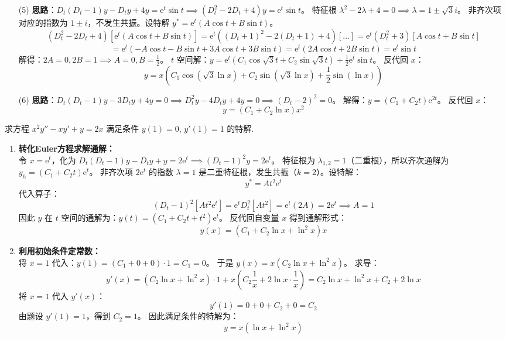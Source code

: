 \documentclass[lang=cn,11pt]{elegantbook}
\begin{document}
\begin{solution}
\begin{enumerate}
    \item[(5)] \textbf{思路}：$D_t(D_t-1)y - D_t y + 4y = \mathrm{e}^t\sin t \implies (D_t^2 - 2D_t + 4)y = \mathrm{e}^t\sin t$。
    特征根 $\lambda^2-2\lambda+4=0 \implies \lambda = 1 \pm \sqrt{3}i$。
    非齐次项对应的指数为 $1 \pm i$，不发生共振。设特解 $y^* = \mathrm{e}^t(A\cos t + B\sin t)$。
    \[
    (D_t^2-2D_t+4)[\mathrm{e}^t(A\cos t+B\sin t)] = \mathrm{e}^t((D_t+1)^2-2(D_t+1)+4)[\dots] = \mathrm{e}^t(D_t^2+3)[A\cos t+B\sin t]
    \]
    \[
    = \mathrm{e}^t(-A\cos t - B\sin t + 3A\cos t + 3B\sin t) = \mathrm{e}^t(2A\cos t + 2B\sin t) = \mathrm{e}^t\sin t
    \]
    解得：$2A=0, 2B=1 \implies A=0, B=\frac{1}{2}$。
    $t$ 空间解：$y = \mathrm{e}^t(C_1\cos\sqrt{3}t + C_2\sin\sqrt{3}t) + \frac{1}{2}\mathrm{e}^t\sin t$。
    反代回 $x$：
    \[
    y = x\left(C_1\cos(\sqrt{3}\ln x) + C_2\sin(\sqrt{3}\ln x) + \frac{1}{2}\sin(\ln x)\right)
    \]
    
    \item[(6)] \textbf{思路}：$D_t(D_t-1)y - 3D_t y + 4y = 0 \implies D_t^2 y - 4D_t y + 4y = 0 \implies (D_t-2)^2 = 0$。
    解得：$y = (C_1 + C_2 t)\mathrm{e}^{2t}$。
    反代回 $x$：
    \[
    y = (C_1 + C_2\ln x)x^2
    \]
\end{enumerate}
\end{solution}



\begin{exercise}[Euler方程初值问题]
求方程 $x^2y''-xy'+y=2x$ 满足条件 $y(1)=0$, $y'(1)=1$ 的特解.
\end{exercise}
\begin{solution}
\begin{enumerate}
    \item \textbf{转化Euler方程求解通解：}\\
    令 $x = \mathrm{e}^t$，化为 $D_t(D_t-1)y - D_t y + y = 2\mathrm{e}^t \implies (D_t-1)^2 y = 2\mathrm{e}^t$。
    特征根为 $\lambda_{1,2} = 1$（二重根），所以齐次通解为 $y_h = (C_1 + C_2 t)\mathrm{e}^t$。
    非齐次项 $2\mathrm{e}^t$ 的指数 $\lambda=1$ 是二重特征根，发生共振（$k=2$）。设特解：
    \[
    y^* = A t^2 \mathrm{e}^t
    \]
    代入算子：
    \[
    (D_t-1)^2[At^2\mathrm{e}^t] = \mathrm{e}^t D_t^2[At^2] = \mathrm{e}^t(2A) = 2\mathrm{e}^t \implies A = 1
    \]
    因此 $y$ 在 $t$ 空间的通解为：$y(t) = (C_1 + C_2 t + t^2)\mathrm{e}^t$。
    反代回自变量 $x$ 得到通解形式：
    \[
    y(x) = (C_1 + C_2\ln x + \ln^2 x)x
    \]

    \item \textbf{利用初始条件定常数：}\\
    将 $x=1$ 代入：$y(1) = (C_1 + 0 + 0) \cdot 1 = C_1 = 0$。
    于是 $y(x) = x(C_2\ln x + \ln^2 x)$。
    求导：
    \[
    y'(x) = (C_2\ln x + \ln^2 x) \cdot 1 + x\left(C_2\frac{1}{x} + 2\ln x \cdot \frac{1}{x}\right) = C_2\ln x + \ln^2 x + C_2 + 2\ln x
    \]
    将 $x=1$ 代入 $y'(x)$：
    \[
    y'(1) = 0 + 0 + C_2 + 0 = C_2
    \]
    由题设 $y'(1)=1$，得到 $C_2 = 1$。
    因此满足条件的特解为：
    \[
    \boxed{y = x(\ln x + \ln^2 x)}
    \]
\end{enumerate}
\end{solution}
\end{document}
